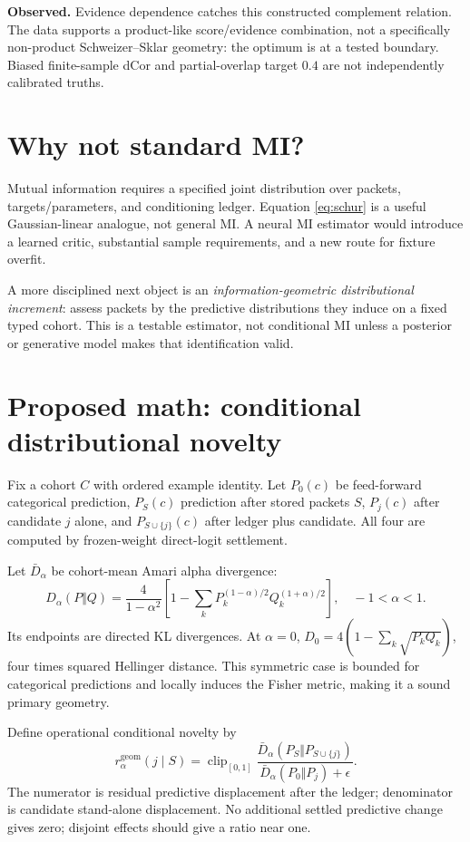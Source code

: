 \documentclass[11pt]{article}
\newcommand{\obs}{\textbf{Observed.} }
\begin{document}
\obs Evidence dependence catches this constructed complement relation. The data supports a product-like score/evidence combination, not a specifically non-product Schweizer--Sklar geometry: the optimum is at a tested boundary. Biased finite-sample dCor and partial-overlap target $0.4$ are not independently calibrated truths.

\section{Why not standard MI?}
Mutual information requires a specified joint distribution over packets, targets/parameters, and conditioning ledger. Equation \ref{eq:schur} is a useful Gaussian-linear analogue, not general MI. A neural MI estimator would introduce a learned critic, substantial sample requirements, and a new route for fixture overfit.

A more disciplined next object is an \emph{information-geometric distributional increment}: assess packets by the predictive distributions they induce on a fixed typed cohort. This is a testable estimator, not conditional MI unless a posterior or generative model makes that identification valid.

\section{Proposed math: conditional distributional novelty}
Fix a cohort $C$ with ordered example identity. Let $P_0(c)$ be feed-forward categorical prediction, $P_S(c)$ prediction after stored packets $S$, $P_j(c)$ after candidate $j$ alone, and $P_{S\cup\{j\}}(c)$ after ledger plus candidate. All four are computed by frozen-weight direct-logit settlement.

Let $\bar D_\alpha$ be cohort-mean Amari alpha divergence:
\begin{equation}
D_\alpha(P\Vert Q)=\frac{4}{1-\alpha^2}
\left[1-\sum_kP_k^{(1-\alpha)/2}Q_k^{(1+\alpha)/2}\right],
\quad -1<\alpha<1.
\label{eq:alpha}
\end{equation}
Its endpoints are directed KL divergences. At $\alpha=0$, $D_0=4(1-\sum_k\sqrt{P_kQ_k})$, four times squared Hellinger distance. This symmetric case is bounded for categorical predictions and locally induces the Fisher metric, making it a sound primary geometry.

Define operational conditional novelty by
\begin{equation}
r_\alpha^{\mathrm{geom}}(j\mid S)=
\operatorname{clip}_{[0,1]}
\frac{\bar D_\alpha(P_S\Vert P_{S\cup\{j\}})}
{\bar D_\alpha(P_0\Vert P_j)+\epsilon}.
\label{eq:ratio}
\end{equation}
The numerator is residual predictive displacement after the ledger; denominator is candidate stand-alone displacement. No additional settled predictive change gives zero; disjoint effects should give a ratio near one.
\end{document}

